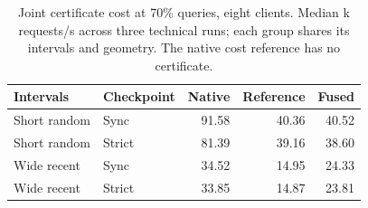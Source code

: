 \begin{table}[t]\caption{Joint certificate cost at 70\% queries, eight clients. Median k requests/s across three technical runs; each group shares its intervals and geometry. The native cost reference has no certificate.}\label{tab:jointcost}\centering
\begin{tabular}{@{}llrrr@{}}\toprule
Intervals & Checkpoint & Native & Reference & Fused\\\midrule
Short random & Sync & 91.58 & 40.36 & 40.52\\
Short random & Strict & 81.39 & 39.16 & 38.60\\
Wide recent & Sync & 34.52 & 14.95 & 24.33\\
Wide recent & Strict & 33.85 & 14.87 & 23.81\\\bottomrule
\end{tabular}\end{table}
